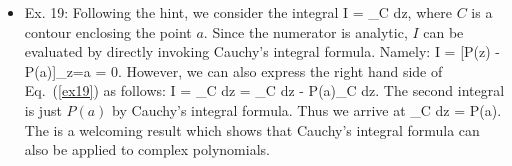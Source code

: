 \documentclass[10pt, letterpaper]{article}
\begin{document}
\begin{itemize}
\begin{enumerate}
	\end{enumerate}

	\item Ex. 19:
	Following the hint, we consider the integral
	\be
		I = \oint_C dz,
		\label{ex19}
	\ee
	where $C$ is a contour enclosing the point $a$. Since the numerator is analytic, $I$ can be evaluated by
	directly invoking Cauchy's integral formula. Namely:
	\be
		I = [P(z) - P(a)]_{z=a} = 0. \nonumber
	\ee
	However, we can also express the right hand side of Eq.~(\ref{ex19}) as follows:
	\be
		I = \oint_C dz = \oint_C dz 
			- P(a)\cdot{}\oint_C dz.
		\nonumber
	\ee
	The second integral is just $P(a)$ by Cauchy's integral formula. Thus we arrive at
	\be
		\oint_C dz = P(a).
	\ee
	The is a welcoming result which shows that Cauchy's integral formula can also be applied to complex
	polynomials.


\end{itemize}
\end{document}
